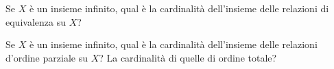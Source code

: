 \begin{es}
  Se $ X $ è un insieme infinito, qual è la cardinalità dell'insieme delle relazioni di equivalenza su $ X $?
\end{es}

\begin{es}
  Se $ X $ è un insieme infinito, qual è la cardinalità dell'insieme delle relazioni d'ordine parziale su $ X $? La cardinalità di quelle di ordine totale?
\end{es}